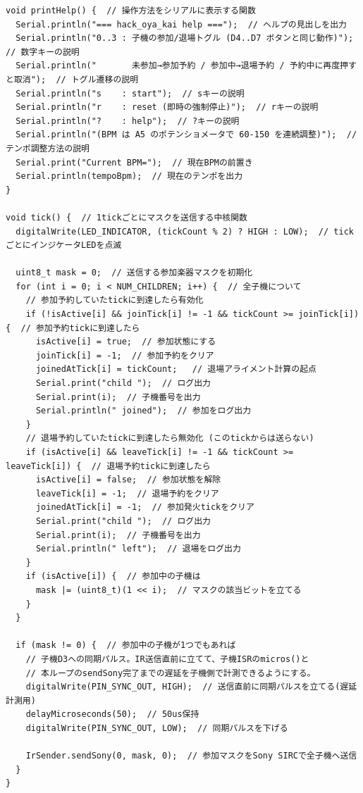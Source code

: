 \documentclass[uplatex,dvipdfmx]{jlreq}
\begin{document}
\begin{lstlisting}
void printHelp() {  // 操作方法をシリアルに表示する関数
  Serial.println("=== hack_oya_kai help ===");  // ヘルプの見出しを出力
  Serial.println("0..3 : 子機の参加/退場トグル (D4..D7 ボタンと同じ動作)");  // 数字キーの説明
  Serial.println("       未参加→参加予約 / 参加中→退場予約 / 予約中に再度押すと取消");  // トグル遷移の説明
  Serial.println("s    : start");  // sキーの説明
  Serial.println("r    : reset (即時の強制停止)");  // rキーの説明
  Serial.println("?    : help");  // ?キーの説明
  Serial.println("(BPM は A5 のポテンショメータで 60-150 を連続調整)");  // テンポ調整方法の説明
  Serial.print("Current BPM=");  // 現在BPMの前置き
  Serial.println(tempoBpm);  // 現在のテンポを出力
}

void tick() {  // 1tickごとにマスクを送信する中核関数
  digitalWrite(LED_INDICATOR, (tickCount % 2) ? HIGH : LOW);  // tickごとにインジケータLEDを点滅

  uint8_t mask = 0;  // 送信する参加楽器マスクを初期化
  for (int i = 0; i < NUM_CHILDREN; i++) {  // 全子機について
    // 参加予約していたtickに到達したら有効化
    if (!isActive[i] && joinTick[i] != -1 && tickCount >= joinTick[i]) {  // 参加予約tickに到達したら
      isActive[i] = true;  // 参加状態にする
      joinTick[i] = -1;  // 参加予約をクリア
      joinedAtTick[i] = tickCount;   // 退場アライメント計算の起点
      Serial.print("child ");  // ログ出力
      Serial.print(i);  // 子機番号を出力
      Serial.println(" joined");  // 参加をログ出力
    }
    // 退場予約していたtickに到達したら無効化 (このtickからは送らない)
    if (isActive[i] && leaveTick[i] != -1 && tickCount >= leaveTick[i]) {  // 退場予約tickに到達したら
      isActive[i] = false;  // 参加状態を解除
      leaveTick[i] = -1;  // 退場予約をクリア
      joinedAtTick[i] = -1;  // 参加発火tickをクリア
      Serial.print("child ");  // ログ出力
      Serial.print(i);  // 子機番号を出力
      Serial.println(" left");  // 退場をログ出力
    }
    if (isActive[i]) {  // 参加中の子機は
      mask |= (uint8_t)(1 << i);  // マスクの該当ビットを立てる
    }
  }

  if (mask != 0) {  // 参加中の子機が1つでもあれば
    // 子機D3への同期パルス。IR送信直前に立てて、子機ISRのmicros()と
    // 本ループのsendSony完了までの遅延を子機側で計測できるようにする。
    digitalWrite(PIN_SYNC_OUT, HIGH);  // 送信直前に同期パルスを立てる(遅延計測用)
    delayMicroseconds(50);  // 50us保持
    digitalWrite(PIN_SYNC_OUT, LOW);  // 同期パルスを下げる

    IrSender.sendSony(0, mask, 0);  // 参加マスクをSony SIRCで全子機へ送信
  }
}

\end{lstlisting}
\end{document}
